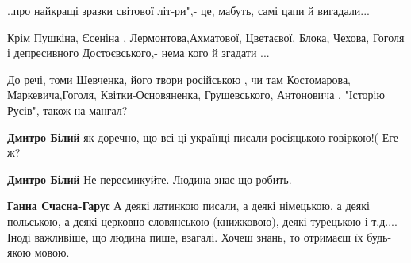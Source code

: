 \begin{itemize}
\begin{itemize}
..про найкращі зразки світової літ-ри",- це, мабуть, самі цапи й вигадали...

Крім Пушкіна, Єсеніна , Лермонтова,Ахматової, Цветаєвої, Блока, Чехова, Гоголя
і депресивного Достоєвського,- нема кого й згадати ...
\end{itemize}

 

До речі, томи Шевченка, його твори російською , чи там Костомарова,
Маркевича,Гоголя, Квітки-Основяненка, Грушевського, Антоновича , "Історію
Русів", також на мангал?

\begin{itemize}
 
\textbf{Дмитро Білий} як доречно, що всі ці українці писали росіяцькою говіркою!(
Еге ж?

 
\textbf{Дмитро Білий} Не пересмикуйте. Людина знає що робить.

 
\textbf{Ганна Счасна-Гарус} А деякі латинкою писали, а деякі німецькою, а деякі польською, а деякі церковно-словянською (книжковою), деякі турецькою і т.д.... Іноді важливіше, що людина пише, взагалі. Хочеш знань, то отримаєш їх будь-якою мовою.

 

\end{itemize}
\end{itemize}
